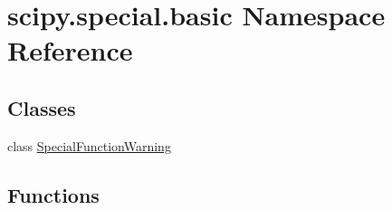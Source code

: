 \hypertarget{namespacescipy_1_1special_1_1basic}{}\section{scipy.\+special.\+basic Namespace Reference}
\label{namespacescipy_1_1special_1_1basic}
\subsection*{Classes}
\begin{DoxyCompactItemize}
\item 
class \hyperlink{classscipy_1_1special_1_1basic_1_1SpecialFunctionWarning}{Special\+Function\+Warning}
\end{DoxyCompactItemize}
\subsection*{Functions}
